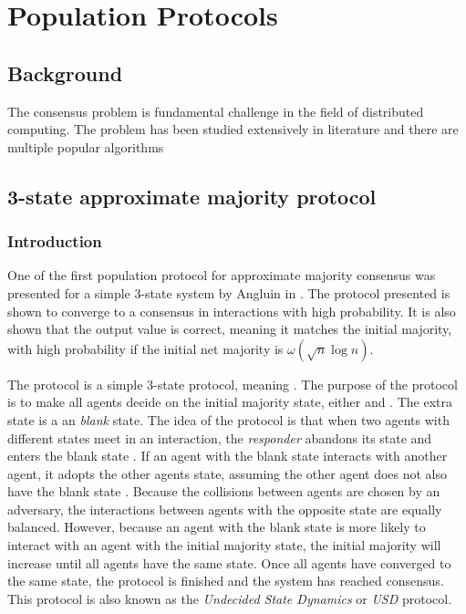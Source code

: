 \section{Population Protocols}
\subsection{Background}

The consensus problem is fundamental challenge in the field of distributed computing. The problem has been studied extensively in literature and there are multiple popular algorithms 


\subsection{3-state approximate majority protocol} \label{3stateApproximatemajority}
\subsubsection{Introduction} \label{angluinIntroduction}

One of the first population protocol for approximate majority consensus was presented for a simple 3-state system by Angluin in \cite{angluinSimplePopulationProtocol2008}. The protocol presented is shown to converge to a consensus in  interactions with high probability. It is also shown that the output value is correct, meaning it matches the initial majority, with high probability if the initial net majority is $\omega(\sqrt{n} \log n)$.

The protocol is a simple 3-state protocol, meaning . The purpose of the protocol is to make all agents decide on the initial majority state, either  and . The extra state  is a an \emph{blank} state. The idea of the protocol is that when two agents with different states meet in an interaction, the \emph{responder} abandons its state and enters the blank state . If an agent with the blank state  interacts with another agent, it adopts the other agents state, assuming the other agent does not also have the blank state . Because the collisions between agents are chosen by an adversary, the interactions between agents with the opposite state are equally balanced. However, because an agent with the blank state is more likely to interact with an agent with the initial majority state, the initial majority will increase until all agents have the same state. Once all agents have converged to the same state, the protocol is finished and the system has reached consensus. This protocol is also known as the \emph{Undecided State Dynamics} or \emph{USD} protocol.


